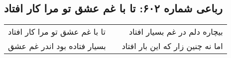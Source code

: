 \begin{center}
\section*{رباعی شماره ۶۰۲: تا با غم عشق تو مرا کار افتاد}
\label{sec:0602}
\begin{longtable}{l p{0.5cm} r}
تا با غم عشق تو مرا کار افتاد
&&
بیچاره دلم در غم بسیار افتاد
\\
بسیار فتاده بود اندر غم عشق
&&
اما نه چنین زار که این بار افتاد
\\
\end{longtable}
\end{center}
